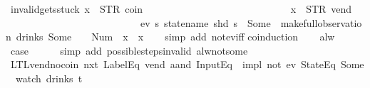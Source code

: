 \begin{isabellebody}
\endisatagproof
{\isafoldproof}%
%
\isadelimproof
\isanewline
%
\endisadelimproof
\isanewline
{}\isamarkupfalse%
\ invalid{\isacharunderscore}gets{\isacharunderscore}stuck{\isacharcolon}\ {\isachardoublequoteopen}x{}\ {\isasymnoteq}\ {\isacharparenleft}STR\ {\isacharprime}{\isacharprime}coin{\isacharprime}{\isacharprime}{\isacharcomma}\ {\isacharbrackleft}{\isacharbrackright}{\isacharparenright}\ {\isasymLongrightarrow}\isanewline
\ \ \ \ \ \ \ \ \ \ \ \ \ \ \ \ \ \ \ \ \ \ \ \ \ \ \ x{}\ {\isasymnoteq}\ {\isacharparenleft}STR\ {\isacharprime}{\isacharprime}vend{\isacharprime}{\isacharprime}{\isacharcomma}\ {\isacharbrackleft}{\isacharbrackright}{\isacharparenright}\ {\isasymLongrightarrow}\isanewline
\ \ \ \ \ \ \ \ \ \ \ \ \ \ \ \ \ \ \ \ \ \ \ \ \ \ \ {\isasymnot}ev\ {\isacharparenleft}{\isasymlambda}s{\isachardot}\ statename\ {\isacharparenleft}shd\ s{\isacharparenright}\ {\isacharequal}\ Some\ {}{\isacharparenright}\ {\isacharparenleft}make{\isacharunderscore}full{\isacharunderscore}observation\ drinks\ {\isacharparenleft}Some\ {}{\isacharparenright}\ {\isacharparenleft}{\isacharless}{\isachargreater}{\isacharparenleft}{}\ {\isacharcolon}{\isacharequal}\ Num\ {}{\isacharparenright}{\isacharparenright}\ {\isacharparenleft}x{}\ {\isacharhash}{\isacharhash}\ x{}{\isacharparenright}{\isacharparenright}{\isachardoublequoteclose}\isanewline
%
\isadelimproof
\ \ %
\endisadelimproof
%
\isatagproof
{}\isamarkupfalse%
\ {\isacharparenleft}simp\ add{\isacharcolon}\ not{\isacharunderscore}ev{\isacharunderscore}iff{\isacharparenright}\isanewline
{}\isamarkupfalse%
{\isacharparenleft}coinduction{\isacharparenright}\isanewline
\ \ \isamarkupfalse%
\ alw\isanewline
\ \ \isamarkupfalse%
\ \isamarkupfalse%
\ {\isacharquery}case\isanewline
\ \ \ \ \isamarkupfalse%
\ {\isacharparenleft}simp\ add{\isacharcolon}\ possible{\isacharunderscore}steps{\isacharunderscore}{}{\isacharunderscore}invalid\ alw{\isacharunderscore}not{\isacharunderscore}some{\isacharparenright}\isanewline
{}\isamarkupfalse%
%
\endisatagproof
{\isafoldproof}%
%
\isadelimproof
\isanewline
%
\endisadelimproof
\isanewline
{}\isamarkupfalse%
\ LTL{\isacharunderscore}vend{\isacharunderscore}no{\isacharunderscore}coin{\isacharcolon}\ {\isachardoublequoteopen}{\isacharparenleft}{\isacharparenleft}nxt\ {\isacharparenleft}LabelEq\ {\isacharprime}{\isacharprime}vend{\isacharprime}{\isacharprime}\ aand\ InputEq\ {\isacharbrackleft}{\isacharbrackright}{\isacharparenright}{\isacharparenright}\ impl\ not\ {\isacharparenleft}ev\ {\isacharparenleft}StateEq\ {\isacharparenleft}Some\ {}{\isacharparenright}{\isacharparenright}{\isacharparenright}{\isacharparenright}\ {\isacharparenleft}watch\ drinks\ t{\isacharparenright}{\isachardoublequoteclose}\isanewline

\end{isabellebody}
